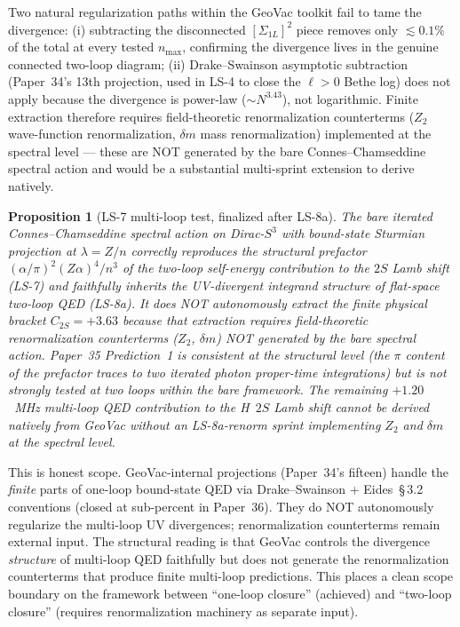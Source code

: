 \documentclass[11pt]{article}
\newtheorem{proposition}{Proposition}
\begin{document}
Two natural regularization paths within the GeoVac toolkit fail to
tame the divergence: (i) subtracting the disconnected $[\Sigma_{1L}]^2$
piece removes only $\lesssim 0.1\%$ of the total at every tested
$n_\text{max}$, confirming the divergence lives in the genuine
connected two-loop diagram; (ii) Drake--Swainson asymptotic
subtraction (Paper~34's 13th projection, used in LS-4 to close the
$\ell > 0$ Bethe log) does not apply because the divergence is
power-law ($\sim N^{3.43}$), not logarithmic.  Finite extraction
therefore requires field-theoretic renormalization counterterms
($Z_2$ wave-function renormalization, $\delta m$ mass renormalization)
implemented at the spectral level — these are NOT generated by the
bare Connes--Chamseddine spectral action and would be a substantial
multi-sprint extension to derive natively.

\begin{proposition}[LS-7 multi-loop test, finalized after LS-8a]
\label{prop:ls7_finalized}
The bare iterated Connes--Chamseddine spectral action on Dirac-$S^3$
with bound-state Sturmian projection at $\lambda = Z/n$ correctly
reproduces the structural prefactor $(\alpha/\pi)^2 (Z\alpha)^4 / n^3$
of the two-loop self-energy contribution to the $2S$ Lamb shift
(LS-7) and faithfully inherits the UV-divergent integrand structure
of flat-space two-loop QED (LS-8a).  It does NOT autonomously
extract the finite physical bracket $C_{2S} = +3.63$ because that
extraction requires field-theoretic renormalization counterterms
($Z_2$, $\delta m$) NOT generated by the bare spectral action.
Paper~35 Prediction~1 is consistent at the structural level
(the $\pi$ content of the prefactor traces to two iterated
photon proper-time integrations) but is not strongly tested at
two loops within the bare framework.  The remaining $+1.20$~MHz
multi-loop QED contribution to the H~$2S$ Lamb shift cannot be
derived natively from GeoVac without an LS-8a-renorm sprint
implementing $Z_2$ and $\delta m$ at the spectral level.
\end{proposition}

This is honest scope.  GeoVac-internal projections (Paper~34's
fifteen) handle the \emph{finite} parts of one-loop bound-state QED
via Drake--Swainson + Eides~\S\,3.2 conventions (closed at sub-percent
in Paper~36).  They do NOT autonomously regularize the multi-loop
UV divergences; renormalization counterterms remain external input.
The structural reading is that GeoVac controls the divergence
\emph{structure} of multi-loop QED faithfully but does not generate
the renormalization counterterms that produce finite multi-loop
predictions.  This places a clean scope boundary on the framework
between ``one-loop closure'' (achieved) and ``two-loop closure''
(requires renormalization machinery as separate input).
\end{document}
